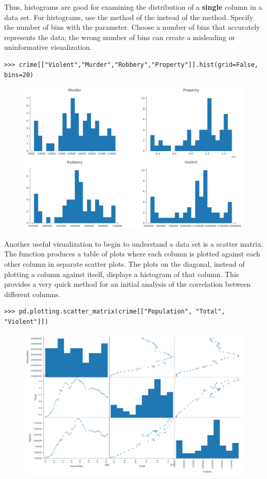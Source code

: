 Thus, histograms are good for examining the distribution of a \textbf{single} column in a data set.
For histograms, use the  method of the  instead of the  method.
Specify the number of bins with the  parameter.
Choose a number of bins that accurately represents the data; the wrong number of bins can create a misleading or uninformative visualization.


\begin{lstlisting}
>>> crime[["Violent","Murder","Robbery","Property"]].hist(grid=False, bins=20)
\end{lstlisting}

\begin{figure}[H]
    \includegraphics[width=.7\textwidth]{figures/hist_subplots.pdf}
\end{figure}

Another useful visualization to begin to understand a data set is a scatter matrix. 
The function  produces a table of plots where each column is plotted against each other column in separate scatter plots.
The plots on the diagonal, instead of plotting a column against itself, displays a histogram of that column.
This provides a very quick method for an initial analysis of the correlation between different columns.

\begin{lstlisting}
>>> pd.plotting.scatter_matrix(crime[["Population", "Total", "Violent"]])
\end{lstlisting}

\begin{figure}[H]
    \includegraphics[width=.7\textwidth]{figures/scatter_table.pdf}
\end{figure}

